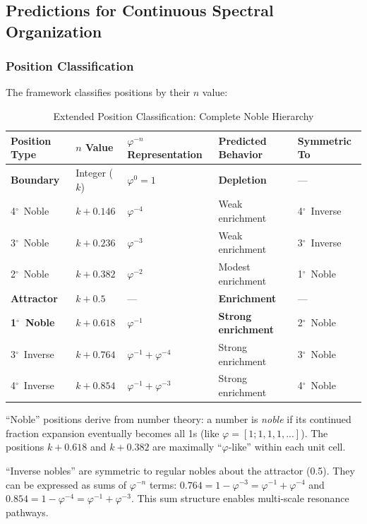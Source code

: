 \documentclass[11pt,a4paper]{article}
\newcommand{\degree}{$^\circ$}  %
\newcommand{\phisym}{\varphi}
\begin{document}
\subsection{Predictions for Continuous Spectral Organization}

\subsubsection{Position Classification}
The framework classifies positions by their $n$ value:

\begin{table}[H]
\centering
\begin{threeparttable}
\caption{Extended Position Classification: Complete Noble Hierarchy}
\label{tab:position_classification}
\begin{tabular}{@{}lllll@{}}
\toprule
Position Type & $n$ Value & $\phisym^{-n}$ Representation & Predicted Behavior & Symmetric To \\
\midrule
\textbf{Boundary} & Integer ($k$) & $\phisym^0 = 1$ & \textbf{Depletion} & --- \\
4\degree\ Noble & $k + 0.146$ & $\phisym^{-4}$ & Weak enrichment & 4\degree\ Inverse \\
3\degree\ Noble & $k + 0.236$ & $\phisym^{-3}$ & Weak enrichment & 3\degree\ Inverse \\
2\degree\ Noble\tnote{*} & $k + 0.382$ & $\phisym^{-2}$ & Modest enrichment & 1\degree\ Noble \\
\textbf{Attractor} & $k + 0.5$ & --- & \textbf{Enrichment} & --- \\
\textbf{1\degree\ Noble}\tnote{*} & $k + 0.618$ & $\phisym^{-1}$ & \textbf{Strong enrichment} & 2\degree\ Noble \\
3\degree\ Inverse\tnote{$\dagger$} & $k + 0.764$ & $\phisym^{-1} + \phisym^{-4}$ & Strong enrichment & 3\degree\ Noble \\
4\degree\ Inverse\tnote{$\dagger$} & $k + 0.854$ & $\phisym^{-1} + \phisym^{-3}$ & Strong enrichment & 4\degree\ Noble \\
\bottomrule
\end{tabular}
\begin{tablenotes}
\small
\item[*] ``Noble'' positions derive from number theory: a number is \textit{noble} if its continued fraction expansion eventually becomes all 1s (like $\phisym = [1; 1, 1, 1, ...]$). The positions $k + 0.618$ and $k + 0.382$ are maximally ``$\phisym$-like'' within each unit cell.
\item[$\dagger$] ``Inverse nobles'' are symmetric to regular nobles about the attractor (0.5). They can be expressed as sums of $\phisym^{-n}$ terms: $0.764 = 1 - \phisym^{-3} = \phisym^{-1} + \phisym^{-4}$ and $0.854 = 1 - \phisym^{-4} = \phisym^{-1} + \phisym^{-3}$. This sum structure enables multi-scale resonance pathways.
\end{tablenotes}
\end{threeparttable}
\end{table}
\end{document}
